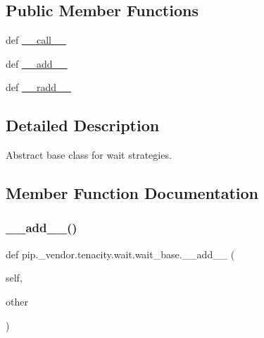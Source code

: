 \subsection*{Public Member Functions}
\begin{DoxyCompactItemize}
\item 
def \hyperlink{classpip_1_1__vendor_1_1tenacity_1_1wait_1_1wait__base_a119cb5b9e31884354b955fdc1f415c31}{\+\_\+\+\_\+call\+\_\+\+\_\+}
\item 
def \hyperlink{classpip_1_1__vendor_1_1tenacity_1_1wait_1_1wait__base_ae1776ca42704b42908df27177d480a99}{\+\_\+\+\_\+add\+\_\+\+\_\+}
\item 
def \hyperlink{classpip_1_1__vendor_1_1tenacity_1_1wait_1_1wait__base_a8ee1534d108f5be24eb190afbb8e20d4}{\+\_\+\+\_\+radd\+\_\+\+\_\+}
\end{DoxyCompactItemize}


\subsection{Detailed Description}
\begin{DoxyVerb}Abstract base class for wait strategies.\end{DoxyVerb}
 

\subsection{Member Function Documentation}
\mbox{\label{classpip_1_1__vendor_1_1tenacity_1_1wait_1_1wait__base_ae1776ca42704b42908df27177d480a99}} 
\subsubsection{\texorpdfstring{\+\_\+\+\_\+add\+\_\+\+\_\+()}{\_\_add\_\_()}}
{\footnotesize\ttfamily def pip.\+\_\+vendor.\+tenacity.\+wait.\+wait\+\_\+base.\+\_\+\+\_\+add\+\_\+\+\_\+ (\begin{DoxyParamCaption}\item[{}]{self,  }\item[{}]{other }\end{DoxyParamCaption})}


